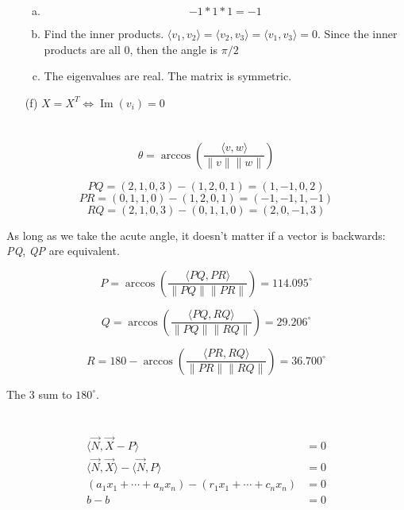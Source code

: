 \documentclass[12pt]{article}
\begin{document}
\begin{enumerate}
\begin{enumerate}[(a)]
		\item \[ -1*1*1 = -1 \]
		
		\item Find the inner products. $ \langle v_1, v_2 \rangle = \langle v_2, v_3 \rangle = \langle v_1, v_3 \rangle = 0 $. Since the inner products are all 0, then the angle is $ \pi/2 $
		
		\item The eigenvalues are real. The matrix is symmetric.
	\end{enumerate}

	\item [(f)]
	$ X = X^T \iff \operatorname{Im}(v_i) = 0$ 
\end{enumerate}
\newpage

\section{}
\[ \theta = \arccos\left(\dfrac{\langle v, w\rangle}{\|v\| \|w\|}\right) \]

\[ \mathit{PQ} = (2,1,0,3) - (1,2,0,1) = (1,-1,0,2) \]
\[ \mathit{PR} = (0,1,1,0) - (1,2,0,1) = (-1,-1,1,-1) \]
\[ \mathit{RQ} = (2,1,0,3) - (0,1,1,0) = (2,0,-1,3) \]

As long as we take the acute angle, it doesn't matter if a vector is backwards: \textit{PQ}, \textit{QP} are equivalent.

\[ \textit{P} = \arccos\left(\dfrac{\langle \mathit{PQ}, \mathit{PR}\rangle}{\|\mathit{PQ}\| \|\mathit{PR}\|}\right) = 114.095^{\circ}\]

\[ \textit{Q} = \arccos\left(\dfrac{\langle \mathit{PQ},\mathit{RQ}\rangle}{\|\mathit{PQ}\| \|\mathit{RQ}\|}\right) = 29.206^{\circ}\]

\[ \textit{R} = 180-\arccos\left(\dfrac{\langle\mathit{PR},\mathit{RQ}\rangle}{\|\mathit{PR}\| \|\mathit{RQ}\|}\right) = 36.700^{\circ}\]

The 3 sum to $ 180^{\circ} $.
\newpage

\section{}
\begin{align*}
	\langle \vec{N}, \vec{X}-P\rangle &= 0\\
	\langle\vec{N}, \vec{X} \rangle - \langle \vec{N}, P\rangle &= 0\\
	(a_1x_1 + \cdots + a_nx_n) - (r_1x_1 + \cdots + c_nx_n) &= 0\\ \tag{solves means evals to $b$}
	b - b &= 0
\end{align*}
\newpage
\end{document}
